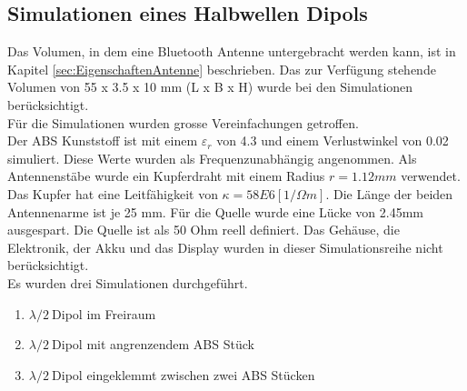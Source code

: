 
\newpage
\subsection{Simulationen eines Halbwellen Dipols}\label{sim_lamda2_Dipol}

Das Volumen, in dem eine Bluetooth Antenne untergebracht werden kann, ist in Kapitel \ref{sec:EigenschaftenAntenne} beschrieben. Das zur Verfügung stehende Volumen von 55 x 3.5 x 10 mm (L x B x H) wurde bei den Simulationen berücksichtigt. \\
Für die Simulationen wurden grosse Vereinfachungen getroffen.\\
Der ABS Kunststoff ist mit einem $\varepsilon_r $ von 4.3 und einem Verlustwinkel von 0.02 simuliert. Diese Werte wurden als Frequenzunabhängig angenommen. Als Antennenstäbe wurde ein  Kupferdraht mit einem Radius $r = 1.12 mm$ verwendet. Das Kupfer hat eine Leitfähigkeit von $\kappa=58E6 [1/\Omega m]$. Die Länge der beiden Antennenarme ist je 25 mm. Für die Quelle wurde eine Lücke von 2.45mm ausgespart. Die Quelle ist als 50 Ohm reell definiert. Das Gehäuse, die Elektronik, der Akku und das Display wurden in dieser Simulationsreihe nicht berücksichtigt.\\ 
Es wurden drei Simulationen durchgeführt.
\begin{enumerate}
\item  $\lambda/2 \ $Dipol im Freiraum
\item  $\lambda/2 \ $Dipol mit angrenzendem ABS Stück
\item  $\lambda/2 \ $Dipol eingeklemmt zwischen zwei ABS Stücken
\end{enumerate}


